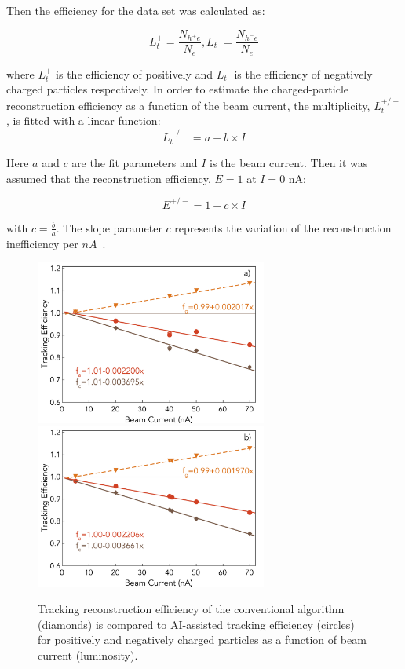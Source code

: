 \documentclass[aps,prl,preprint,12pt]{elsarticle}
\begin{document}
Then the efficiency for the data set was calculated as:

\begin{equation}
L_t^+ = \frac{N_{h^+e}}{N_e} , L_t^- = \frac{N_{h^-e}}{N_e} 
\end{equation}

where $L_t^+$ is the efficiency of positively and $L_t^-$ is the efficiency of negatively 
charged particles respectively. In order to estimate the charged-particle reconstruction efficiency 
as a function of the beam current, the multiplicity, $L_t^{+/-}$, is fitted with a linear function:
\begin{equation}
L_t^{+/-} = a + b\times I 
\end{equation}

Here $a$ and $c$ are the fit parameters and $I$ is the beam current. Then it was assumed that the 
reconstruction efficiency, $E=1$ at $I=0$ nA:

\begin{equation}
E^{+/-} = 1 + c \times I 
\end{equation}

with $c=\frac{b}{a}$. The slope parameter $c$ represents the variation of the reconstruction 
inefficiency per $nA$~\cite{Stepanyan:2020bg}.
 
 \begin{figure}[!ht]
\begin{center}
 \includegraphics[width=3.0in]{images/figure_lscan_pos.pdf}
 \includegraphics[width=3.0in]{images/figure_lscan_neg.pdf}
\caption {Tracking reconstruction efficiency of the conventional algorithm (diamonds)
is compared to AI-assisted tracking efficiency (circles) for positively and negatively 
charged particles as a function of beam current (luminosity).   }
 \label{lumi:scan}
 \end{center}
\end{figure}
\end{document}
